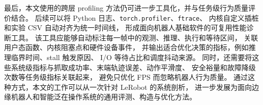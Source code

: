 最后，本文使用的跨层 profiling 方法仍可进一步工具化，并与任务级行为质量评价结合。
后续可以将 Python 日志、\texttt{torch.profiler}、\texttt{ftrace}、
内核自定义插桩和实验 CSV 自动对齐为统一时间线，
形成面向机器人基础软件的可复用性能诊断工具。
该工具应能够自动标注每一帧中的观测、推理、执行和等待区间，
关联用户态函数、内核阻塞点和硬件设备事件，
并输出适合优化决策的指标，例如推理临界时间、stall 触发原因、
I/O 等待占比和调度抖动来源。
同时，还需要将这些系统级指标与抓取成功率、末端轨迹误差、动作平滑度、
安全裕量和故障降级次数等任务级指标关联起来，
避免只优化 FPS 而忽略机器人行为质量。
通过这种方式，本文的工作可以从一次针对 LeRobot 的系统剖析，
进一步发展为面向边缘机器人和智能泛在操作系统的通用评测、构造与优化方法。
